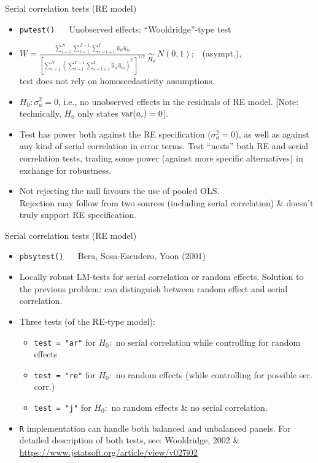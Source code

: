 \documentclass[usenames,dvipsnames]{beamer}
\begin{document}
\begin{frame}{Serial correlation tests (RE model)}
\small 
\vspace{-0.2cm}
\begin{itemize}
    \item \texttt{pwtest()} ~~ Unobserved effects: ``Wooldridge''-type test
    \smallskip 
    \item $W = \frac{\displaystyle\sum_{i=1}^N 
        \displaystyle\sum_{t=1}^{T-1}
        \displaystyle\sum_{s=t+1}^T \hat{u}_{it}\hat{u}_{is}}
        {\left[\displaystyle\sum_{i=1}^N \left(
        \displaystyle\sum_{t=1}^{T-1}
        \displaystyle\sum_{s=t+1}^T \hat{u}_{it}\hat{u}_{is}
        \right)^{\!2}~ \right]^{1/2}}~
        \underset{H_0}{\sim}~ N(0,1)$;~~(asympt.), \\test does not rely on homoscedasticity assumptions.
    \medskip
    \item $H_0: \sigma_{a}^2 = 0$, i.e., no unobserved effects in the residuals of RE model. [Note: technically, $H_0$ only states $\textnormal{var}(a_i)=0$]. 
    \item Test has power both against the RE specification ($\sigma_{a}^2 = 0$), as well as against any kind of serial correlation in error terms. Test ``nests'' both RE and serial correlation tests, trading some power (against more specific alternatives) in exchange for robustness.
    \item Not rejecting the null favours the use of pooled OLS.\\Rejection may follow from two sources (including serial correlation) \& doesn't truly support RE specification.
\end{itemize}
\end{frame}
\begin{frame}{Serial correlation tests (RE model)}
\small 
\begin{itemize}
    \item \texttt{pbsytest()} ~~ Bera, Sosa-Escudero, Yoon (2001)
    \medskip
    \item Locally robust LM-tests for serial correlation or random effects. Solution to the previous problem: can distinguish between random effect and serial correlation. 
    \medskip
    \item Three tests (of the RE-type model):\\ \smallskip
    \begin{itemize}
        \item \texttt{test = "ar"}  for $H_0:$ no serial correlation while controlling for random effects
        \smallskip
        \item \texttt{test = "re"} for $H_0:$ no random effects (while controlling for possible ser. corr.)
        \smallskip
        \item \texttt{test = "j"} for $H_0:$ no random effects \& no serial correlation.
    \end{itemize}
        \bigskip
        \item \texttt{R} implementation can handle both balanced and unbalanced panels. For detailed description of both tests, see:  Wooldridge, 2002 \& \url{https://www.jstatsoft.org/article/view/v027i02}
\end{itemize}
\end{frame}
\end{document}
